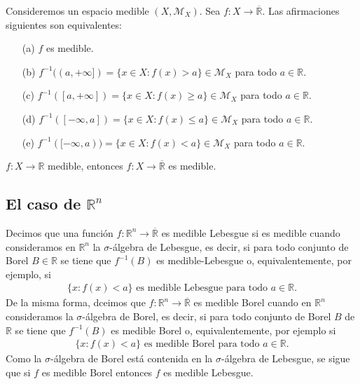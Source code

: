 \begin{prop}
Consideremos un espacio medible $(X, \mathcal{M}_X)$. Sea $f: X \longrightarrow \overline{\mathbb{R}}$. Las afirmaciones siguientes son equivalentes:
\begin{enumerate}
    \item[(a)] $f$ es medible.
    \item[(b)] $f^{-1}((a,+\infty]) = \{ x \in X : f(x) > a\} \in \mathcal{M}_X$ para todo $a \in \mathbb{R}$.
    \item[(c)] $f^{-1}([a,+\infty]) = \{ x \in X : f(x) \ge a\} \in \mathcal{M}_X$ para todo $a \in \mathbb{R}$.
    \item[(d)] $f^{-1}([-\infty,a]) = \{ x \in X : f(x) \leq a\} \in \mathcal{M}_X$ para todo $a \in \mathbb{R}$.
    \item[(e)] $f^{-1}([-\infty,a)) = \{ x \in X : f(x) < a\} \in \mathcal{M}_X$ para todo $a \in \mathbb{R}$.
\end{enumerate}
\end{prop}
\begin{obs}
$f: X \longrightarrow \mathbb{R}$ medible, entonces $f: X \longrightarrow \overline{\mathbb{R}}$ es medible.
\end{obs}
\subsection{El caso de $\mathbb{R}^n$}
\begin{defi}
 Decimos que una función $f: \mathbb{R}^n \longrightarrow \overline{\mathbb{R}}$ es medible Lebesgue si es medible cuando consideramos en $\mathbb{R}^n$ la $\sigma$-álgebra de Lebesgue, es decir, si para todo conjunto de Borel $B \in \mathbb{R}$ se tiene que $f^{-1}(B)$ es medible-Lebesgue o, equivalentemente, por ejemplo, si
 \begin{align*}
     \{ x : f(x) < a \} \text{ es medible Lebesgue para todo } a \in \mathbb{R}.
 \end{align*}
 De la misma forma, dceimos que  $f: \mathbb{R}^n \longrightarrow \overline{\mathbb{R}}$ es medible Borel cuando en $\mathbb{R}^n$ consideramos la $\sigma$-álgebra de Borel, es decir, si para todo conjunto de Borel $B$ de $\mathbb{R}$ se tiene que $f^{-1}(B)$ es medible Borel o, equivalentemente, por ejemplo si
 \begin{align*}
     \{ x : f(x) < a \} \text{ es medible Borel para todo } a \in \mathbb{R}.
 \end{align*}
 Como la  $\sigma$-álgebra de Borel está contenida en la  $\sigma$-álgebra de Lebesgue, se sigue que si $f$ es medible Borel entonces $f$ es medible Lebesgue.
\end{defi}

